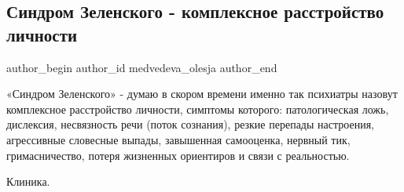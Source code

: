  
 
 
 
 
 
\subsection{Синдром Зеленского - комплексное расстройство личности}
\label{sec:26_11_2021.fb.medvedeva_olesja.3.sindrom_zelenskogo}
 
\ifcmt
 author_begin
   author_id medvedeva_olesja
 author_end
\fi

«Синдром Зеленского» - думаю в скором времени именно так психиатры назовут
комплексное расстройство личности, симптомы которого: патологическая ложь,
дислексия, несвязность речи (поток сознания), резкие перепады настроения,
агрессивные словесные выпады, завышенная самооценка, нервный тик,
гримасничество, потеря жизненных ориентиров и связи с реальностью. 

Клиника.


